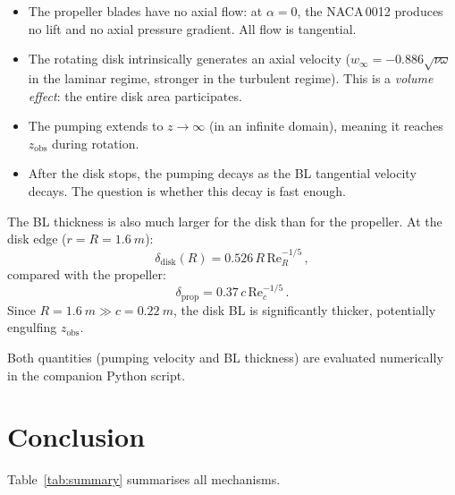\documentclass[11pt,a4paper]{article}
\begin{document}
\begin{itemize}
  \item The propeller blades have no axial flow: at $\alpha = 0$, the
        NACA\,0012 produces no lift and no axial pressure gradient. All
        flow is tangential.
  \item The rotating disk intrinsically generates an axial velocity
        ($w_\infty = -0.886\sqrt{\nu\omega}$ in the laminar regime,
        stronger in the turbulent regime). This is a \emph{volume effect}:
        the entire disk area participates.
  \item The pumping extends to $z \to \infty$ (in an infinite domain),
        meaning it reaches $z_\mathrm{obs}$ during rotation.
  \item After the disk stops, the pumping decays as the BL tangential
        velocity decays. The question is whether this decay is fast
        enough.
\end{itemize}

The BL thickness is also much larger for the disk than for the
propeller. At the disk edge ($r = R = \SI{1.6}{m}$):
\begin{equation}
  \delta_\mathrm{disk}(R) = 0.526\,R\,\mathrm{Re}_R^{-1/5}\,,
\end{equation}
compared with the propeller:
\begin{equation}
  \delta_\mathrm{prop} = 0.37\,c\,\mathrm{Re}_c^{-1/5}\,.
\end{equation}
Since $R = \SI{1.6}{m} \gg c = \SI{0.22}{m}$, the disk BL is
significantly thicker, potentially engulfing $z_\mathrm{obs}$.

Both quantities (pumping velocity and BL thickness) are evaluated
numerically in the companion Python script.


\section{Conclusion}
\label{sec:conclusion}

Table~\ref{tab:summary} summarises all mechanisms.
\end{document}
